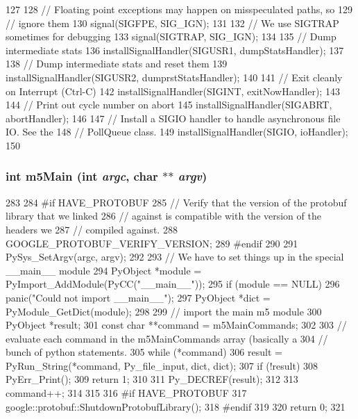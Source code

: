 \begin{DoxyCode}
127 {
128     // Floating point exceptions may happen on misspeculated paths, so
129     // ignore them
130     signal(SIGFPE, SIG_IGN);
131 
132     // We use SIGTRAP sometimes for debugging
133     signal(SIGTRAP, SIG_IGN);
134 
135     // Dump intermediate stats
136     installSignalHandler(SIGUSR1, dumpStatsHandler);
137 
138     // Dump intermediate stats and reset them
139     installSignalHandler(SIGUSR2, dumprstStatsHandler);
140 
141     // Exit cleanly on Interrupt (Ctrl-C)
142     installSignalHandler(SIGINT, exitNowHandler);
143 
144     // Print out cycle number on abort
145     installSignalHandler(SIGABRT, abortHandler);
146 
147     // Install a SIGIO handler to handle asynchronous file IO. See the
148     // PollQueue class.
149     installSignalHandler(SIGIO, ioHandler);
150 }
\end{DoxyCode}
\hypertarget{init_8hh_a2c29b07c70d79dfd1b822d2b0cdd50c0}{
\subsubsection[{m5Main}]{\setlength{\rightskip}{0pt plus 5cm}int m5Main (int {\em argc}, \/  char $\ast$$\ast$ {\em argv})}}
\label{init_8hh_a2c29b07c70d79dfd1b822d2b0cdd50c0}



\begin{DoxyCode}
283 {
284 #if HAVE_PROTOBUF
285     // Verify that the version of the protobuf library that we linked
286     // against is compatible with the version of the headers we
287     // compiled against.
288     GOOGLE_PROTOBUF_VERIFY_VERSION;
289 #endif
290 
291     PySys_SetArgv(argc, argv);
292 
293     // We have to set things up in the special __main__ module
294     PyObject *module = PyImport_AddModule(PyCC("__main__"));
295     if (module == NULL)
296         panic("Could not import __main__");
297     PyObject *dict = PyModule_GetDict(module);
298 
299     // import the main m5 module
300     PyObject *result;
301     const char **command = m5MainCommands;
302 
303     // evaluate each command in the m5MainCommands array (basically a
304     // bunch of python statements.
305     while (*command) {
306         result = PyRun_String(*command, Py_file_input, dict, dict);
307         if (!result) {
308             PyErr_Print();
309             return 1;
310         }
311         Py_DECREF(result);
312 
313         command++;
314     }
315 
316 #if HAVE_PROTOBUF
317     google::protobuf::ShutdownProtobufLibrary();
318 #endif
319 
320     return 0;
321 }
\end{DoxyCode}

